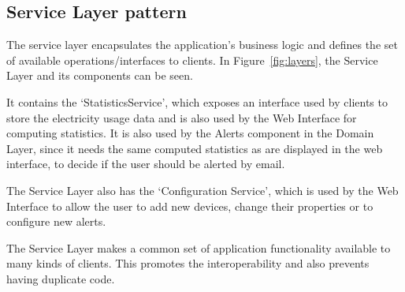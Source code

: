 

\subsection{Service Layer pattern}
\label{sec:service-layer-pattern}
The service layer encapsulates the application's business logic and defines the set of available operations/interfaces to clients. In Figure~\ref{fig:layers}, the Service Layer and its components can be seen. 

It contains the `StatisticsService', which exposes an interface used by clients to store the electricity usage data and is also used by the Web Interface for computing statistics. It is also used by the Alerts component in the Domain Layer, since it needs the same computed statistics as are displayed in the web interface, to decide if the user should be alerted by email.

The Service Layer also has the `Configuration Service', which is used by the Web Interface to allow the user to add new devices, change their properties or to configure new alerts.

The Service Layer makes a common set of application functionality available to many kinds of clients. This promotes the interoperability and also prevents having duplicate code.

